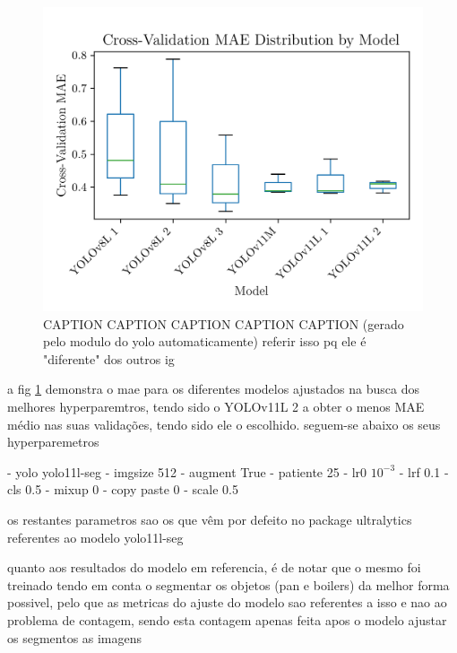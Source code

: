 \documentclass[conference]{IEEEtran}
\begin{document}
\begin{figure}[H]
    \centering
    \includegraphics[width=1\linewidth]{assets/model02_mae_boxplot.png}
    \caption{CAPTION CAPTION CAPTION CAPTION CAPTION (gerado pelo modulo do yolo automaticamente) referir isso pq ele é "diferente" dos outros ig}
    \label{fig:model02_mae_boxplot}
\end{figure}

a fig \ref{fig:model02_mae_boxplot} demonstra o mae para os diferentes modelos ajustados na busca dos melhores hyperparemtros, tendo sido o YOLOv11L 2 a obter o menos MAE médio nas suas validações, tendo sido ele o escolhido. seguem-se abaixo os seus hyperparemetros

- yolo yolo11l-seg
- imgsize 512
- augment True
- patiente 25
- lr0 $10^{-3}$
- lrf 0.1
- cls 0.5
- mixup 0
- copy paste 0
- scale 0.5

os restantes parametros sao os que vêm por defeito no package ultralytics
referentes ao modelo yolo11l-seg

quanto aos resultados do modelo em referencia, é de notar que o mesmo foi treinado tendo em conta o segmentar os objetos (pan e boilers) da melhor forma possivel, pelo que as metricas do ajuste do modelo sao referentes a isso e nao ao problema de contagem, sendo esta contagem apenas feita apos o modelo ajustar os segmentos as imagens
\end{document}
